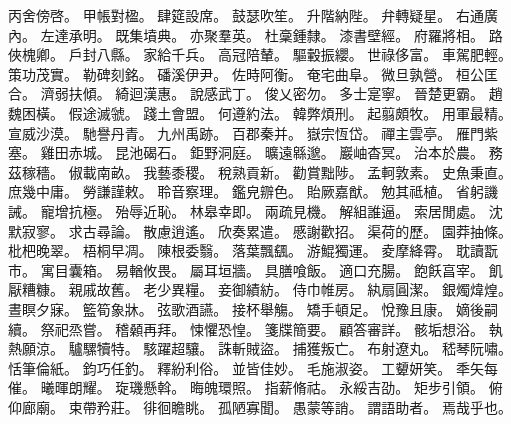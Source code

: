丙舍傍啓。%
甲帳對楹。%
肆筵設席。%
鼓瑟吹笙。%
升階納陛。%
弁轉疑星。%
右通廣內。%
左達承明。%
既集墳典。%
亦聚羣英。%
杜稾鍾隸。%
漆書壁經。%
府羅將相。%
路俠槐卿。%
戶封八縣。%
家給千兵。%
高冠陪輦。%
驅轂振纓。%
世祿侈富。%
車駕肥輕。%
策功茂實。%
勒碑刻銘。%
磻溪伊尹。%
佐時阿衡。%
奄宅曲阜。%
微旦孰營。%
桓公匡合。%
濟弱扶傾。%
綺迴漢惠。%
說感武丁。%
俊乂密勿。%
多士寔寧。%
晉楚更霸。%
趙魏困橫。%
假途滅虢。%
踐土會盟。%
何遵約法。%
韓弊煩刑。%
起翦頗牧。%
用軍最精。%
宣威沙漠。%
馳譽丹青。%
九州禹跡。%
百郡秦并。%
嶽宗恆岱。%
禪主雲亭。%
雁門紫塞。%
雞田赤城。%
昆池碣石。%
鉅野洞庭。%
曠遠緜邈。%
巖岫杳冥。%
治本於農。%
務茲稼穡。%
俶載南畝。%
我藝黍稷。%
稅熟貢新。%
勸賞黜陟。%
孟軻敦素。%
史魚秉直。%
庶幾中庸。%
勞謙謹敕。%
聆音察理。%
鑑皃辧色。%
貽厥嘉猷。%
勉其祗植。%
省躬譏誡。%
寵增抗極。%
殆辱近恥。%
林皋幸即。%
兩疏見機。%
解組誰逼。%
索居閒處。%
沈默寂寥。%
求古尋論。%
散慮逍遙。%
欣奏累遣。%
慼謝歡招。%
渠荷的歷。%
園莽抽條。%
枇杷晚翠。%
梧桐早凋。%
陳根委翳。%
落葉飄颻。%
游鯤獨運。%
夌摩絳霄。%
耽讀翫市。%
寓目囊箱。%
易輶攸畏。%
屬耳垣牆。%
具膳喰飯。%
適口充腸。%
飽飫亯宰。%
飢厭糟糠。%
親戚故舊。%
老少異糧。%
妾御績紡。%
侍巾帷房。%
紈扇圓潔。%
銀燭煒煌。%
晝瞑夕寐。%
籃筍象牀。%
弦歌酒讌。%
接杯舉觴。%
矯手頓足。%
悅豫且康。%
嫡後嗣續。%
祭祀烝嘗。%
稽顙再拜。%
悚懼恐惶。%
箋牒簡要。%
顧答審詳。%
骸垢想浴。%
執熱願涼。%
驢騾犢特。%
駭躍超驤。%
誅斬賊盜。%
捕獲叛亡。%
布射遼丸。%
嵇琴阮嘯。%
恬筆倫紙。%
鈞巧任釣。%
釋紛利俗。%
並皆佳妙。%
毛施淑姿。%
工顰妍笑。%
秊矢每催。%
曦暉朗耀。%
琁璣懸斡。%
晦魄環照。%
指薪脩祜。%
永綏吉劭。%
矩步引領。%
俯仰廊廟。%
束帶矜莊。%
徘徊瞻眺。%
孤陋寡聞。%
愚蒙等誚。%
謂語助者。%
焉哉乎也。%
%

\endinput

\chapter{正文}%
%
\watermarkoff%
%
\pagestyle{my}%
%
\ugenkokai

